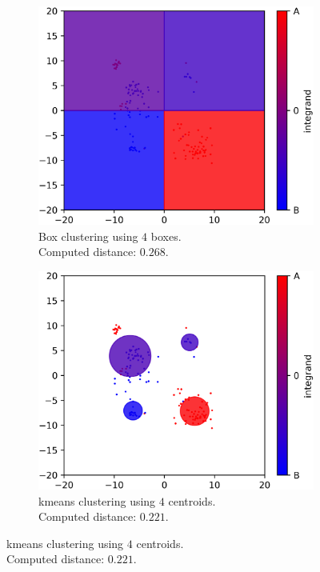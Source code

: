 \begin{modified}
\newpage
\begin{figure}[H]
	\centering
	\begin{subfigure}{0.48\linewidth}
		\includegraphics[width=\linewidth]{Figures/box_comparison.png}
		\caption[Box clustering, example of comparison]{Box clustering using $4$ boxes.\\ Computed distance: $0.268$.}
		\label{fig:box_clustering}
	\end{subfigure}
	\hfill
	\begin{subfigure}{0.48\linewidth}
		\includegraphics[width=\linewidth]{Figures/kmeans_comparison.png}
		\caption[\gls{kmeans} clustering, example of comparison]{\gls{kmeans} clustering using $4$ centroids.\\ Computed distance: $0.221$.}

\end{subfigure}
\end{figure}
\end{modified}
